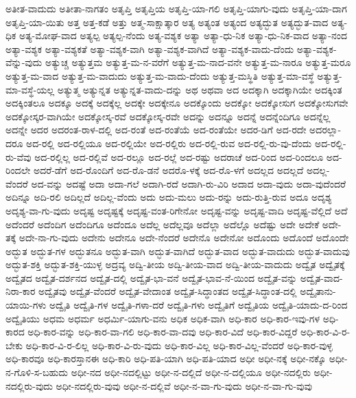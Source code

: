 {ಅತೀತ-ವಾದುದು
ಅತೀತಾ-ನಾಗತಂ
ಅತೃಪ್ತಿ
ಅತೃಪ್ತಿಯ
ಅತೃಪ್ತಿ-ಯಾ-ಗಲಿ
ಅತೃಪ್ತಿ-ಯಾಗು-ವುದು
ಅತೃಪ್ತಿ-ಯಾ-ದಾಗ
ಅತೃಪ್ತಿ-ಯಾ-ಯಿತು
ಅತ್ತ
ಅತ್ತ-ಕಡೆ
ಅತ್ತು
ಅತ್ಮ-ಸಾಕ್ಷಾತ್ಕಾರ
ಅತ್ಯ
ಅತ್ಯಂತ
ಅತ್ಯಂದ
ಅತ್ಯದ್ಭುತ
ಅತ್ಯದ್ಭುತ-ವಾದ
ಅತ್ಯ-ಧಿಕ
ಅತ್ಯ-ಮೋಘ-ವಾದ
ಅತ್ಯಲ್ಪ
ಅತ್ಯಲ್ಪ-ನೆಂದು
ಅತ್ಯ-ವಶ್ಯಕ
ಅತ್ಯಾ
ಅತ್ಯಾ-ಧು-ನಿಕ
ಅತ್ಯಾ-ಧು-ನಿಕ-ವಾದ
ಅತ್ಯಾ-ನಂದ
ಅತ್ಯಾ-ವಶ್ಯಕ
ಅತ್ಯಾ-ವಶ್ಯಕತೆ
ಅತ್ಯಾ-ವಶ್ಯಕ-ವಾಗಿ
ಅತ್ಯಾ-ವಶ್ಯಕ-ವಾಗಿದೆ
ಅತ್ಯಾ-ವಶ್ಯಕ-ವಾದು-ದೆಂದು
ಅತ್ಯಾ-ವಶ್ಯಕ-ವೆನ್ನು-ವುದು
ಅತ್ಯುಚ್ಚ
ಅತ್ಯುತ್ತಮ
ಅತ್ಯುತ್ತ-ಮ-ನ-ವರೆಗೆ
ಅತ್ಯುತ್ತ-ಮ-ನಾದ-ವನೇ
ಅತ್ಯುತ್ತ-ಮ-ನಾರೂ
ಅತ್ಯುತ್ತ-ಮರೂ
ಅತ್ಯುತ್ತ-ಮ-ವಾದ
ಅತ್ಯುತ್ತ-ಮ-ವಾದುದು
ಅತ್ಯುತ್ತ-ಮ-ವಾದು-ದೆಂದು
ಅತ್ಯುತ್ತ-ಮಸ್ಥಿತಿ
ಅತ್ಯುತ್ತ-ಮಾ-ವಸ್ಥೆ
ಅತ್ಯುತ್ತ-ಮಾ-ವಸ್ಥೆ-ಯಲ್ಲ
ಅತ್ಯುತ್ಮ
ಅತ್ಯುನ್ನತ
ಅತ್ಯುನ್ನತ-ವಾದು-ದನ್ನು
ಅಥ
ಅಥವಾ
ಅದ
ಅದಕ್ಕಾಗಿ
ಅದಕ್ಕಾಗಿಯೇ
ಅದಕ್ಕಿಂತ
ಅದಕ್ಕಿಂತಲೂ
ಅದಕ್ಕೂ
ಅದಕ್ಕೆ
ಅದಕ್ಕೆಲ್ಲ
ಅದಕ್ಕೇ
ಅದಕ್ಕೇನೂ
ಅದಕ್ಕೊಂದು
ಅದಕ್ಕೋ
ಅದಕ್ಕೋಸುಗ
ಅದಕ್ಕೋಸುಗವೇ
ಅದಕ್ಕೋಸ್ಕರ-ವಾಗಿಯೇ
ಅದಕ್ಕೋಸ್ಕ-ರವೆ
ಅದಕ್ಕೋಸ್ಕ-ರವೇ
ಅದನ್ನು
ಅದನ್ನೂ
ಅದನ್ನೆ
ಅದನ್ನೆಂದಿಗೂ
ಅದನ್ನೆಲ್ಲ
ಅದನ್ನೇ
ಅದರ
ಅದರಂತ-ರಾಳ-ದಲ್ಲಿ
ಅದ-ರಂತೆ
ಅದ-ರಂತೆಯೆ
ಅದ-ರಂತೆಯೇ
ಅದರ-ಡಿಗೆ
ಅದ-ರದೇ
ಅದರಲ್ಲಾ-ದರೂ
ಅದ-ರಲ್ಲಿ
ಅದ-ರಲ್ಲಿಯೂ
ಅದ-ರಲ್ಲಿಯೇ
ಅದ-ರಲ್ಲಿರು
ಅದ-ರಲ್ಲಿ-ರುವ
ಅದ-ರಲ್ಲಿ-ರು-ವು-ದೆಂದು
ಅದ-ರಲ್ಲಿ-ರು-ವೆವು
ಅದ-ರಲ್ಲಿಲ್ಲ
ಅದ-ರಲ್ಲಿವೆ
ಅದ-ರಲ್ಲೂ
ಅದ-ರಲ್ಲೆ
ಅದ-ರಷ್ಟು
ಅದರಾಚೆ
ಅದ-ರಿಂದ
ಅದ-ರಿಂದಲೂ
ಅದ-ರಿಂದಲೇ
ಅದರೆ-ಡೆಗೆ
ಅದ-ರೊಂದಿಗೆ
ಅದ-ರೊ-ಡನೆ
ಅದರೊ-ಳಕ್ಕೆ
ಅದ-ರೊ-ಳಗೆ
ಅದಲ್ಲದ
ಅದಲ್ಲದೆ
ಅದಲ್ಲ-ವೆಂದರೆ
ಅದ-ವನ್ನು
ಅದಷ್ಟೆ
ಅದಾ
ಅದಾ-ಗಲೆ
ಅದಾಗಿ-ರದೆ
ಅದಾಗಿ-ರು-ವಿರಿ
ಅದಾದ
ಅದಾ-ವುದು
ಅದಾ-ವುದೆಂದರೆ
ಅದಿನ್ನೂ
ಅದಿ-ರಲಿ
ಅದಿಲ್ಲದೆ
ಅದಿಲ್ಲ-ವೆಂದು
ಅದು
ಅದು-ಮಲು
ಅದು-ರನ್ನು
ಅದು-ರುತ್ತಿ-ರುವ
ಅದೂ
ಅದೃಶ್ಯ
ಅದೃಶ್ಯ-ವಾ-ಗು-ವುದು
ಅದೃಷ್ಟ
ಅದೃಷ್ಟಕ್ಕೆ
ಅದೃಷ್ಟ-ವಂತ-ರಿಗೇನೋ
ಅದೃಷ್ಟ-ವನ್ನು
ಅದೃಷ್ಟ-ವಾದಿ
ಅದೃಷ್ಟ-ವೆಲ್ಲಿದೆ
ಅದೆ
ಅದೆಂದರೆ
ಅದೆಂದಿಗ
ಅದೆಂದಿಗೂ
ಅದೆಂದೂ
ಅದೆಲ್ಲ
ಅದೆಲ್ಲವೂ
ಅದೆಲ್ಲಾ
ಅದೆಲ್ಲೊ
ಅದೆಷ್ಟು
ಅದೇ
ಅದೇಕೆ
ಅದೇ-ತಕ್ಕೆ
ಅದೇ-ನಾ-ಗು-ವುದು
ಅದೇನು
ಅದೇನೂ
ಅದೇ-ನೆಂದರೆ
ಅದೇನೊ
ಅದೇನೋ
ಅದೊಂದು
ಅದೊಂದೆ
ಅದೊಂದೇ
ಅದ್ಭುತ
ಅದ್ಭುತ-ಗಳ
ಅದ್ಭುತನೂ
ಅದ್ಭುತ-ವಾಗಿ
ಅದ್ಭುತ-ವಾಗಿದೆ
ಅದ್ಭುತ-ವಾದ
ಅದ್ಭುತ-ವಾದುದು
ಅದ್ಭುತ-ವಾದುವು
ಅದ್ಭುತ-ಶಕ್ತಿ
ಅದ್ಭುತ-ಶಕ್ತಿ-ಯುಳ್ಳ
ಅದ್ರವ್ಯ
ಅದ್ವಿ-ತೀಯ
ಅದ್ವಿ-ತೀಯ-ವಾದ
ಅದ್ವಿ-ತೀಯ-ವಾದುದು
ಅದ್ವೈತ
ಅದ್ವೈತಕ್ಕೆ
ಅದ್ವೈತದ
ಅದ್ವೈತ-ದರ್ಶನದ
ಅದ್ವೈತ-ದಲ್ಲಿ
ಅದ್ವೈತ-ಭಾ-ವನೆ
ಅದ್ವೈತ-ಭಾವ-ನೆ-ಯಿಂದ
ಅದ್ವೈತ-ವನ್ನು
ಅದ್ವೈತ-ವಾದ-ನಿರಾ-ಕಾರ
ಅದ್ವೈತವು
ಅದ್ವೈತ-ವೆಂದರೆ
ಅದ್ವೈತ-ವೇದಾಂತ
ಅದ್ವೈತ-ಸಿದ್ಧಾಂತದ
ಅದ್ವೈತ-ಸಿದ್ಧಾಂತ-ದಲ್ಲಿ
ಅದ್ವೈತಾನು-ಯಾಯಿ-ಗಳು
ಅದ್ವೈತಿ
ಅದ್ವೈತಿ-ಗಳ
ಅದ್ವೈತಿ-ಗಳಾ-ದರೆ
ಅದ್ವೈತಿ-ಗಳು
ಅದ್ವೈತಿಗೆ
ಅದ್ವೈತಿಯ
ಅದ್ವೈತಿ-ಯಾದು-ದ-ರಿಂದ
ಅದ್ವೈತಿಯು
ಅಧಮ
ಅಧರ್ಮ
ಅಧರ್ಮಿ-ಯಾಗು-ವನು
ಅಧಿಕ
ಅಧಿಕ-ವಾಗಿ
ಅಧಿ-ಕಾರ
ಅಧಿ-ಕಾರ-ಇವು-ಗಳ
ಅಧಿ-ಕಾರದ
ಅಧಿ-ಕಾರ-ವನ್ನು
ಅಧಿ-ಕಾರ-ವಾ-ಗಲಿ
ಅಧಿ-ಕಾರ-ವಾ-ದವು
ಅಧಿ-ಕಾರ-ವಿದೆ
ಅಧಿ-ಕಾರ-ವಿದ್ದರೆ
ಅಧಿ-ಕಾರ-ವಿ-ರ-ಬೇಕು
ಅಧಿ-ಕಾರ-ವಿ-ರ-ಲಿಲ್ಲ
ಅಧಿ-ಕಾರ-ವಿ-ರು-ವುದು
ಅಧಿ-ಕಾರ-ವಿಲ್ಲ
ಅಧಿ-ಕಾರ-ವಿಲ್ಲ-ವೆಂದರೆ
ಅಧಿ-ಕಾರ-ವುಳ್ಳ
ಅಧಿ-ಕಾರವೂ
ಅಧಿ-ಕಾರಸ್ತಾನಈ
ಅಧಿ-ಕಾರಿ
ಅಧಿ-ಪತಿ-ಯಾಗಿ
ಅಧಿ-ಪತಿ-ಯಾದ
ಅಧೀ
ಅಧೀ-ನಕ್ಕೆ
ಅಧೀ-ನಕ್ಕೊ
ಅಧೀ-ನ-ಗೊಳಿ-ಸ-ಬಹುದು
ಅಧೀ-ನದ
ಅಧೀ-ನದಲ್ಲಿಟ್ಟು
ಅಧೀ-ನ-ದಲ್ಲಿದೆ
ಅಧೀ-ನ-ದಲ್ಲಿಯೂ
ಅಧೀ-ನದಲ್ಲಿರು
ಅಧೀ-ನದಲ್ಲಿರು-ವುದು
ಅಧೀ-ನದಲ್ಲಿರು-ವುವು
ಅಧೀ-ನ-ದಲ್ಲಿವೆ
ಅಧೀ-ನ-ವಾ-ಗು-ವುದು
ಅಧೀ-ನ-ವಾ-ಗು-ವುವು
}
